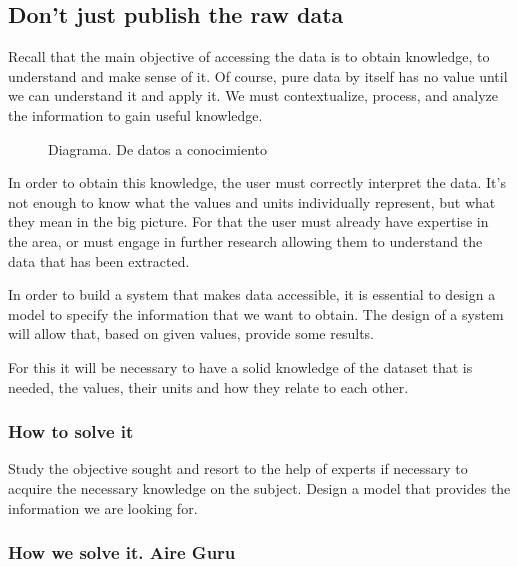 \subsection{Don't just publish the raw data}

Recall that the main objective of accessing the data is to obtain knowledge, to understand and make sense of it. Of course, 
pure data by itself has no value until we can understand it and apply it. We must contextualize, process, and analyze the 
information to gain useful knowledge. \\
    
\begin{figure}[ht]
    \centering 
    \caption{Diagrama. De datos a conocimiento}
\end{figure}
 
In order to obtain this knowledge, the user must correctly interpret the data. It's not enough to know what the values and 
units individually represent, but what they mean in the big picture. For that the user must already have expertise in the 
area, or must engage in further research allowing them to understand the data that has been extracted.
    
In order to build a system that makes data accessible, it is essential to design a model to specify the
information that we want to obtain. The design of a system will allow that, based on given values, provide some results.

For this it will be necessary to have a solid knowledge of the dataset that is needed, the values, their units and how they relate to each other.

\subsubsection*{How to solve it} 

Study the objective sought and resort to the help of experts if necessary to acquire the necessary knowledge
on the subject. Design a model that provides the information we are looking for.

\subsubsection*{How we solve it. Aire Guru} 

